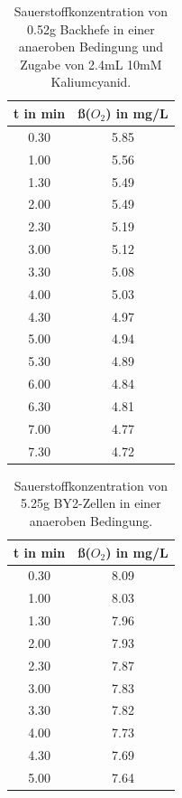 \documentclass[10pt,a4paper]{article}
\begin{document}
	\begin{table}[H]
		\centering
		\caption{Sauerstoffkonzentration von 0.52g Backhefe in einer anaeroben Bedingung und Zugabe von 2.4mL 10mM Kaliumcyanid.}
		\label{tab:O2 Backhefe mit KCN}
		\begin{tabular}{cc}
			\toprule
			t in min& ß($O_2$) in mg/L\\
			\midrule
			0.30 & 5.85\\
			1.00 & 5.56\\
			1.30 & 5.49\\
			2.00 & 5.49\\
			2.30 & 5.19 \\
			3.00 & 5.12 \\
			3.30 & 5.08 \\
			4.00 & 5.03\\
			4.30 & 4.97\\
			5.00 & 4.94 \\
			5.30 & 4.89\\
			6.00 & 4.84\\
			6.30 & 4.81\\
			7.00 & 4.77 \\
			7.30 & 4.72\\
			\bottomrule
		\end{tabular}
	\end{table}	
	
	\begin{table}[H]
		\centering
		\caption{Sauerstoffkonzentration von 5.25g BY2-Zellen in einer anaeroben Bedingung.}
		\label{tab:O2 BY2 ohne KCN}
		\begin{tabular}{cc}
			\toprule
			t in min& ß($O_2$) in mg/L\\
			\midrule
			0.30 & 8.09\\
			1.00 & 8.03\\
			1.30 & 7.96\\
			2.00 & 7.93\\
			2.30 & 7.87 \\
			3.00 & 7.83 \\
			3.30 & 7.82 \\
			4.00 & 7.73\\
			4.30 & 7.69\\
			5.00 & 7.64 \\
			\bottomrule
		\end{tabular}
	\end{table}	
	
\end{document}
